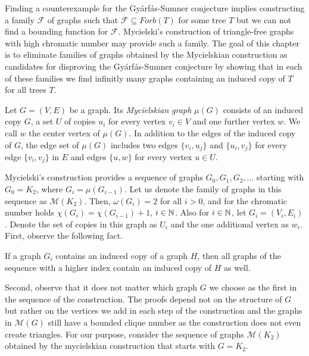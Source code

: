 Finding a counterexample for the Gyárfás-Sumner conjecture implies constructing a family $\mathcal{F}$ of graphs such that $\mathcal{F}\subseteq\textit{Forb}(T)$ for some tree $T$ but we can not find a bounding function for $\mathcal{F}$. Mycielski's construction of triangle-free graphs with high chromatic number \cite{My55} may provide such a family. The goal of this chapter is to eliminate families of graphs obtained by the Mycielskian construction as candidates for disproving the Gyárfás-Sumner conjecture by showing that in each of these families we find infinitly many graphs containing an induced copy of $T$ for all trees $T$.

\begin{defn}
Let $G=(V,E)$ be a graph. Its \textit{Mycielskian graph} $\mu(G)$ consists of an induced copy $G$, a set $U$ of copies $u_i$ for every vertex $v_i\in V$ and one further vertex $w$. We call $w$ the center vertex of $\mu (G)$. In addition to the edges of the induced copy of $G$, the edge set of $\mu(G)$ includes two edges $\lbrace v_i,u_j\rbrace$ and $\lbrace u_i,v_j\rbrace$ for every edge $\lbrace v_i,v_j\rbrace$ in $E$ and edges $\lbrace u,w\rbrace$ for every vertex $u\in U$. 
\end{defn}
Mycielski's construction provides a sequence of graphs $G_0,G_1, G_2,\dots $ starting with $G_0=K_2$, where $G_i = \mu (G_{i-1})$. Let us denote the family of graphs in this sequence as $\mathcal{M}(K_2)$. Then, $\omega (G_i) = 2$ for all $i>0$, and for the chromatic number holds $\chi (G_i)=\chi (G_{i-1}) +1$, $i\in\mathbb{N}$. Also for $i\in\mathbb{N}$, let $G_i=(V_i,E_i)$. Denote the set of copies in this graph as $U_i$ and the one additional vertex as $w_i$. First, observe the following fact.
\begin{note}\label{o1my}
If a graph $G_i$ contains an induced copy of a graph $H$, then all graphs of the sequence with a higher index contain an induced copy of $H$ as well.
\end{note}

Second, observe that it does not matter which graph $G$ we choose as the first in the sequence of the construction. The proofs depend not on the structure of $G$ but rather on the vertices we add in each step of the construction and the graphs in $\mathcal{M}(G)$ still have a bounded clique number as the construction does not even create triangles. For our purpose, consider the sequence of graphs $\mathcal{M}(K_2)$ obtained by the mycielskian construction that starts with $G = K_2$.

